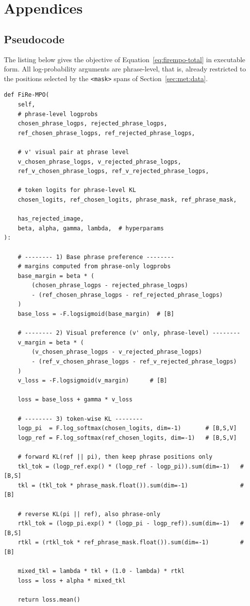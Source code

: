 \newpage
\appendix
{}
\section*{Appendices}
\renewcommand{\thesubsection}{\Alph{subsection}}
\setcounter{subsection}{0}

\subsection{\ourloss{} Pseudocode}
\label{app:pseudocode}

The listing below gives the objective of Equation~\ref{eq:firempo-total} in executable form. All log-probability arguments are phrase-level, that is, already restricted to the positions selected by the \texttt{<mask>} spans of Section~\ref{sec:met:data}.

\begin{verbatim}
def FiRe-MPO(
    self,
    # phrase-level logprobs
    chosen_phrase_logps, rejected_phrase_logps,
    ref_chosen_phrase_logps, ref_rejected_phrase_logps,

    # v' visual pair at phrase level
    v_chosen_phrase_logps, v_rejected_phrase_logps,
    ref_v_chosen_phrase_logps, ref_v_rejected_phrase_logps,

    # token logits for phrase-level KL
    chosen_logits, ref_chosen_logits, phrase_mask, ref_phrase_mask,

    has_rejected_image,
    beta, alpha, gamma, lambda,  # hyperparams
):

    # -------- 1) Base phrase preference --------
    # margins computed from phrase-only logprobs
    base_margin = beta * (
        (chosen_phrase_logps - rejected_phrase_logps)
        - (ref_chosen_phrase_logps - ref_rejected_phrase_logps)
    )
    base_loss = -F.logsigmoid(base_margin)  # [B]

    # -------- 2) Visual preference (v' only, phrase-level) --------
    v_margin = beta * (
        (v_chosen_phrase_logps - v_rejected_phrase_logps)
        - (ref_v_chosen_phrase_logps - ref_v_rejected_phrase_logps)
    )
    v_loss = -F.logsigmoid(v_margin)      # [B]

    loss = base_loss + gamma * v_loss

    # -------- 3) token-wise KL --------
    logp_pi  = F.log_softmax(chosen_logits, dim=-1)       # [B,S,V]
    logp_ref = F.log_softmax(ref_chosen_logits, dim=-1)   # [B,S,V]

    # forward KL(ref || pi), then keep phrase positions only
    tkl_tok = (logp_ref.exp() * (logp_ref - logp_pi)).sum(dim=-1)   # [B,S]
    tkl = (tkl_tok * phrase_mask.float()).sum(dim=-1)               # [B]

    # reverse KL(pi || ref), also phrase-only
    rtkl_tok = (logp_pi.exp() * (logp_pi - logp_ref)).sum(dim=-1)   # [B,S]
    rtkl = (rtkl_tok * ref_phrase_mask.float()).sum(dim=-1)         # [B]

    mixed_tkl = lambda * tkl + (1.0 - lambda) * rtkl
    loss = loss + alpha * mixed_tkl

    return loss.mean()
\end{verbatim}

